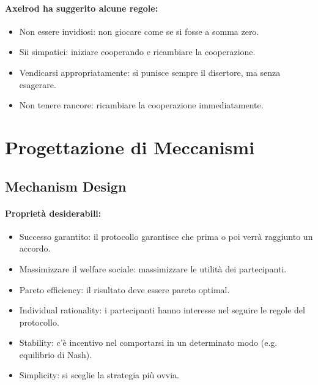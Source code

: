 
\paragraph{Axelrod ha suggerito alcune regole:}

\begin{itemize}
  \item Non essere invidiosi: non giocare come se si fosse a somma zero. 
  \item Sii simpatici: iniziare cooperando e ricambiare la cooperazione. 
  \item Vendicarsi appropriatamente: si punisce sempre il disertore, ma senza esagerare. 
  \item Non tenere rancore: ricambiare la cooperazione immediatamente.
\end{itemize}

\section{Progettazione di Meccanismi}

\subsection{Mechanism Design}


\paragraph{Proprietà desiderabili:}

\begin{itemize}
  \item Successo garantito: il protocollo garantisce che prima o poi verrà raggiunto un accordo. 
  \item Massimizzare il welfare sociale: massimizzare le utilità dei partecipanti. 
  \item Pareto efficiency: il risultato deve essere pareto optimal. 
  \item Individual rationality: i partecipanti hanno interesse nel seguire le regole del protocollo. 
  \item Stability: c'è incentivo nel comportarsi in un determinato modo (e.g. equilibrio di Nash). 
  \item Simplicity: si sceglie la strategia più ovvia.
\end{itemize}

